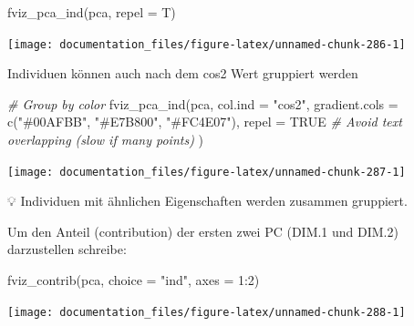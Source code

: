 \documentclass[
]{article}
\newenvironment{Shaded}{\begin{snugshade}}{\end{snugshade}}
\newcommand{\AttributeTok}[1]{\textcolor[rgb]{0.77,0.63,0.00}{#1}}
\newcommand{\CommentTok}[1]{\textcolor[rgb]{0.56,0.35,0.01}{\textit{#1}}}
\newcommand{\ConstantTok}[1]{\textcolor[rgb]{0.00,0.00,0.00}{#1}}
\newcommand{\DecValTok}[1]{\textcolor[rgb]{0.00,0.00,0.81}{#1}}
\newcommand{\FunctionTok}[1]{\textcolor[rgb]{0.00,0.00,0.00}{#1}}
\newcommand{\NormalTok}[1]{#1}
\newcommand{\SpecialCharTok}[1]{\textcolor[rgb]{0.00,0.00,0.00}{#1}}
\newcommand{\StringTok}[1]{\textcolor[rgb]{0.31,0.60,0.02}{#1}}
\begin{document}
\begin{Shaded}
\begin{Highlighting}[]

\FunctionTok{fviz\_pca\_ind}\NormalTok{(pca, }\AttributeTok{repel =}\NormalTok{ T)}
\end{Highlighting}
\end{Shaded}

\begin{center}\texttt{[image: documentation\_files/figure-latex/unnamed-chunk-286-1]} \end{center}

Individuen können auch nach dem cos2 Wert gruppiert werden

\begin{Shaded}
\begin{Highlighting}[]

\CommentTok{\# Group by color}
\FunctionTok{fviz\_pca\_ind}\NormalTok{(pca, }\AttributeTok{col.ind =} \StringTok{"cos2"}\NormalTok{, }
             \AttributeTok{gradient.cols =} \FunctionTok{c}\NormalTok{(}\StringTok{"\#00AFBB"}\NormalTok{, }\StringTok{"\#E7B800"}\NormalTok{, }\StringTok{"\#FC4E07"}\NormalTok{),}
             \AttributeTok{repel =} \ConstantTok{TRUE} \CommentTok{\# Avoid text overlapping (slow if many points)}
\NormalTok{             )}
\end{Highlighting}
\end{Shaded}

\begin{center}\texttt{[image: documentation\_files/figure-latex/unnamed-chunk-287-1]} \end{center}

💡 Individuen mit ähnlichen Eigenschaften werden zusammen gruppiert.

Um den Anteil (contribution) der ersten zwei PC (DIM.1 und DIM.2) darzustellen schreibe:

\begin{Shaded}
\begin{Highlighting}[]

\FunctionTok{fviz\_contrib}\NormalTok{(pca, }\AttributeTok{choice =} \StringTok{"ind"}\NormalTok{, }\AttributeTok{axes =} \DecValTok{1}\SpecialCharTok{:}\DecValTok{2}\NormalTok{)}
\end{Highlighting}
\end{Shaded}

\begin{center}\texttt{[image: documentation\_files/figure-latex/unnamed-chunk-288-1]} \end{center}
\end{document}
